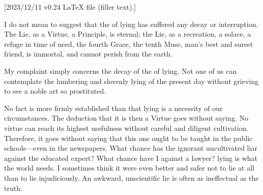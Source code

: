 %
[2023/12/11 v0.24 LaTeX file (filler text).]





I do not mean to suggest that the  of lying has
suffered any decay or interruption. The Lie, as a Virtue, a
Principle, is eternal; the Lie, as a recreation, a solace, a refuge in
time of need, the fourth Grace, the tenth Muse, man's best and surest
friend, is immortal, and cannot perish from the earth.

My complaint simply concerns the decay of the  of lying.
Not one of us can contemplate the lumbering and slovenly lying of the
present day without grieving to see a noble art so prostituted.

No fact is more firmly established than that lying is a necessity of our
circumstances. The deduction that it is then a Virtue goes without
saying. No virtue can reach its highest usefulness without careful and
diligent cultivation. Therefore, it goes without saying that this one
ought to be taught in the public schools---even in the newspapers. What
chance has the ignorant uncultivated liar against the educated expert?
What chance have I against a lawyer?  lying
is what the world needs. I sometimes think it were even better and safer
not to lie at all than to lie injudiciously. An awkward, unscientific
lie is often as ineffectual as the truth.

